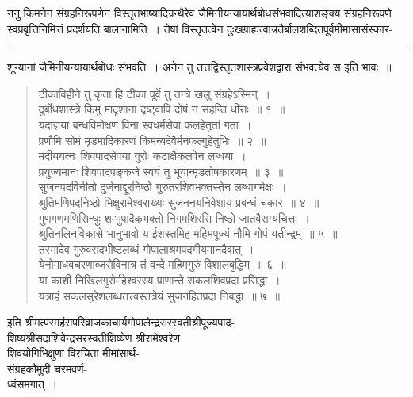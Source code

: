 \documentclass[11pt, openany]{book}
\begin{document}
  {\br ननु} किमनेन संग्रहनिरूपणेन विस्तृतभाष्यादिग्रन्थैरेव जैमिनीयन्यायार्थबोधसंभवादित्याशङ्क्य संग्रहनिरूपणे स्वप्रवृत्तिनिमित्तं प्रदर्शयति {\br बालानामिति~।} तेषां विस्तृतत्वेन दुःखग्राह्यत्वान्नतैर्बालशब्दितपूर्वमीमांसासंस्कार-
\newpage
\fancyhead[LO]{संहारः ]}
\hrule
\vspace{3mm}
\noindent
शून्यानां जैमिनीयन्यायार्थबोधः संभवति~। अनेन तु तत्तद्विस्तृतशास्त्रप्रवेशद्वारा संभवत्येव स इति भावः~॥~
\begin{quote}
    \ab 
 टीकाविहीने तु कृता हि टीका पूर्वे तु तन्त्रे खलु संग्रहेऽस्मिन्~।\\
 दुर्बोधशास्त्रे किमु मादृशानां दृष्ट्वापि दोषं न सहन्ति धीराः~॥ १~॥\\

 यदाज्ञया बन्धविमोक्षणं विना स्वधर्मसेवा फलहेतुतां गता~।\\
 प्रणौमि सोमं मृडमादिकारणं किमन्यदेवैर्मनफल्गुहेतुभिः~॥ २~॥~\\

मदीययत्नः शिवपादसेवया गुरोः कटाक्षैकलवेन लब्धया~। \\
 प्रयुज्यमानः शिवपादपङ्कजे स्वयं तु भूयान्मृडतोषकारणम्~॥ ३~॥ \\

सुजनपदविनीतो दुर्जनाद्दूरनिष्ठो गुरुतरशिवभक्तस्तेन लब्धागमेक्षः~।\\
 श्रुतिमणिपदनिष्ठो भिक्षुरामेश्वराख्यः सुजननयनिवेशाय प्रबन्धं चकार~॥ ४~॥~\\

गुणगणमणिसिन्धुः शम्भुपादैकभक्तो निगमशिरसि निष्ठो जातवैराग्यचित्तः~।~\\
 श्रुतिनलिनविकासे भानुभावो य ईशस्तमिह महिमपूज्यं नौमि \footnotemarkA[1]गोपं
यतीन्द्रम्~॥ ५~॥~\\

तस्मादेव गुरुवरादभीष्टलब्धं गोपालाश्रमपदगीयमानदैवात्~।\\
 येनोमाधवचरणाब्जसेविनात्र तं वन्दे महिमगुरुं विशालबुद्धिम्~॥ ६~॥\\

 या काशी निखिलगुरोर्महेश्वरस्य प्राणान्ते सकलशिवप्रदा प्रसिद्धा~। \\
 यत्राहं सकलसुरेशलब्धतत्त्वस्तत्रेयं सुजनहितप्रदा निबद्धा~॥ ७~॥    
\end{quote}
\begin{center}
 इति श्रीमत्परमहंसपरिव्राजकाचार्यगोपालेन्द्रसरस्वतीश्रीपूज्यपाद-\\
 शिष्यश्रीसदाशिवेन्द्रसरस्वतीशिष्येण श्रीरामेश्वरेण \\
 शिवयोगिभिक्षुणा विरचिता मीमांसार्थ-\\
 संग्रहकौमुदी चरमवर्ण-\\
 ध्वंसमगात्~।  \\
\vspace{5mm}
\end{center}
\end{document}
